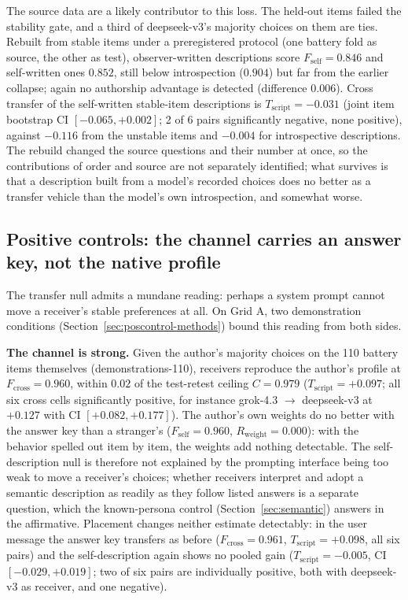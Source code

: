 \documentclass[11pt]{article}
\newcommand{\Fself}{F_{\mathrm{self}}}
\newcommand{\Fcross}{F_{\mathrm{cross}}}
\newcommand{\Tscript}{T_{\mathrm{script}}}
\newcommand{\Rweight}{R_{\mathrm{weight}}}
\begin{document}
The source data are a likely contributor to this loss. The held-out items
failed the stability gate, and a third of deepseek-v3's majority choices on
them are ties. Rebuilt
from stable items under a preregistered protocol (one battery fold as
source, the other as test), observer-written descriptions score $\Fself = 0.846$ and
self-written ones $0.852$, still below introspection ($0.904$) but far from
the earlier collapse; again no authorship advantage is detected (difference
$0.006$).
Cross transfer of the self-written stable-item descriptions is
$\Tscript = -0.031$ (joint item bootstrap CI $[-0.065, +0.002]$; 2 of 6
pairs significantly negative, none positive), against $-0.116$ from the
unstable items and $-0.004$ for introspective descriptions. The rebuild
changed the source questions and their number at once, so the contributions
of order and source are not separately identified; what survives is that a
description built from a model's recorded choices does no better as a
transfer vehicle than the model's own introspection, and somewhat worse.

\subsection{Positive controls: the channel carries an answer key, not the
native profile}
\label{sec:poscontrol}
The transfer null admits a mundane reading: perhaps a system prompt cannot
move a receiver's stable preferences at all. On Grid A, two demonstration conditions
(Section~\ref{sec:poscontrol-methods}) bound this reading from both sides.

\textbf{The channel is strong.} Given the author's majority choices on the 110
battery items themselves (demonstrations-110), receivers reproduce the
author's profile at $\Fcross = 0.960$, within $0.02$ of the test-retest
ceiling $C = 0.979$ ($\Tscript = +0.097$; all six cross cells significantly
positive, for instance grok-4.3 $\to$ deepseek-v3 at $+0.127$ with CI
$[+0.082, +0.177]$).
The author's own weights do no better with the answer key than a stranger's
($\Fself = 0.960$, $\Rweight = 0.000$): with the behavior spelled out item by
item, the weights add nothing detectable. The
self-description null is therefore not explained by the prompting interface
being too weak to move a receiver's choices; whether receivers interpret and
adopt a semantic description as readily as they follow listed answers is a
separate question, which the known-persona control
(Section~\ref{sec:semantic}) answers in the affirmative. Placement changes
neither estimate detectably: in the user message the answer key transfers as
before ($\Fcross = 0.961$, $\Tscript = +0.098$, all six pairs) and the
self-description again shows no pooled gain ($\Tscript = -0.005$, CI
$[-0.029, +0.019]$; two of six pairs are individually positive, both with
deepseek-v3 as receiver, and one negative).
\end{document}
